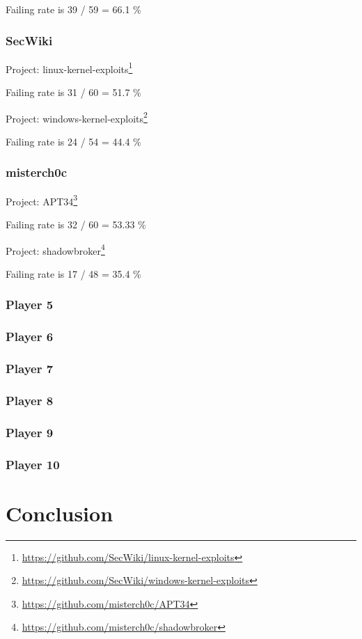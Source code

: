 \documentclass[]{acmart}
\begin{document}
Failing rate is 39 / 59 = 66.1 \%

\subsubsection{SecWiki}
Project: linux-kernel-exploits\footnote{\url{https://github.com/SecWiki/linux-kernel-exploits}}

Failing rate is 31 / 60 = 51.7 \%

Project: windows-kernel-exploits\footnote{\url{https://github.com/SecWiki/windows-kernel-exploits}}

Failing rate is 24 / 54 = 44.4 \%

\subsubsection{misterch0c}
Project: APT34\footnote{\url{ https://github.com/misterch0c/APT34}}

Failing rate is 32 / 60 = 53.33 \%

Project: shadowbroker\footnote{\url{https://github.com/misterch0c/shadowbroker}}

Failing rate is 17 / 48 = 35.4 \%

\subsubsection{Player 5}
\subsubsection{Player 6}
\subsubsection{Player 7}
\subsubsection{Player 8}
\subsubsection{Player 9}
\subsubsection{Player 10}
\section{Conclusion}
\end{document}
